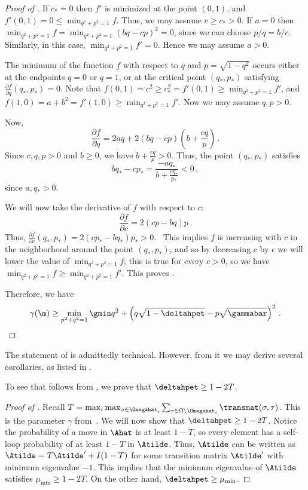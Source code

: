 \documentclass{toc}
\begin{document}
\begin{proof}[Proof of ]
If $c_*=0$ then $f'$ is minimized at the point $(0,1)$, and $ f'(0,1)=0\leq  \min_{q^2+p^2=1} f$.  Thus, we may assume $c\geq c_*>0$.  If $a=0$ then $\min_{q^2+p^2=1} f =  \min_{q^2+p^2=1}(bq-cp)^2 = 0$, since we can choose $p/q = b/c$.  Similarly, in this case, $\min_{q^2+p^2=1} f'=0$.  Hence we may assume $a>0$.


The minimum of the function $f$ with respect to $q$ and $p=\sqrt{1-q^2}$ occurs either at the endpoints $q=0$ or $q=1$, or at the critical point $(q_*, p_*)$ satisfying $\frac{\partial f}{\partial q}(q_*,p_*)=0$.
Note that $f(0,1) = c^2\geq c_*^2=f'(0,1)\geq \min_{q^2+p^2=1} f'$, and $f(1,0) = a+b^2=f'(1,0)\geq \min_{q^2+p^2=1} f'$.  
Now we may assume $q, p>0$.   

Now,
\[\frac{\partial f}{\partial q}  = 2aq + 2(bq-cp)\left(b+\frac{cq}{p}\right)\,.\]
Since $c,q,p>0$ and $b\geq 0$, we have $b+\frac{cq}{p}>0$.  Thus, the point $(q_*,p_*)$  satisfies
\[bq_*-cp_* = \frac{-aq_*}{b+\frac{cq_*}{p_*}}< 0\,,\]
since $a,q_*>0$.  



%
We will now take the derivative of $f$ with respect to $c$:
\[\frac{\partial f}{\partial c}  = 2(cp-bq)p\,.\]
Thus, $\frac{\partial f}{\partial c}(q_*,p_*) = 2(cp_*-bq_*)p_* >0$.  This implies $f$ is increasing with $c$ in the neighborhood around the point $(q_*, p_*)$, and so by decreasing $c$ by $\epsilon$ we will lower the value of $\min_{q^2+p^2=1} f$; this is true for every $c>0$, so we have $\min_{q^2+p^2=1} f \geq \min_{q^2+p^2=1} f'$.  This proves .
%
%


Therefore, we have
\[\gamma(\m) \geq  \min_{p^2+q^2=1}\gmin q^2+\left(q\sqrt{1-\deltahpet} - p\sqrt{\gammabar}\right)^2\,.\qedhere\]
\end{proof}
%

The statement of  is admittedly technical.
However, from it we may derive several corollaries, as listed in . 

To see that  follows from
, we prove that $\deltahpet\geq 1-2T$.

%
%
%
\begin{proof}[Proof of ]
Recall $T = 
\max_i\max_{\sigma\in\Omegahat_i}\sum_{\tau\in\Omega\setminus\Omegahat_i}\transmat(\sigma,\tau)$.  
This is the parameter $\gamma$ from~\cite{jstv04}. We will now show that $\deltahpet\geq 1-2T$.
Notice the probability of a move in $\Ahat$ is at least 
$1-T$, so every element has a self-loop probability of at least $1-T$ 
in $\Atilde$. 
Thus, $\Atilde$ can be 
written as $\Atilde = T\Atilde' + I(1-T)$ for some transition matrix 
$\Atilde'$ with minimum eigenvalue $-1$.  This implies that the 
minimum eigenvalue of $\Atilde$ satisfies $\mu_{\min}\geq 1-2T$.  On 
the other hand, $\deltahpet\geq \mu_{\min}$. 
\end{proof}
%
\end{document}
